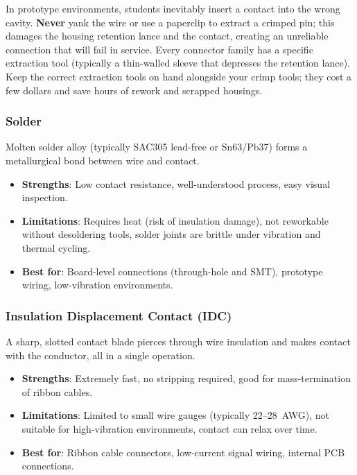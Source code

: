 \begin{warningbox}
In prototype environments, students inevitably insert a contact into the wrong cavity. \textbf{Never} yank the wire or use a paperclip to extract a crimped pin; this damages the housing retention lance and the contact, creating an unreliable connection that will fail in service. Every connector family has a specific extraction tool (typically a thin-walled sleeve that depresses the retention lance). Keep the correct extraction tools on hand alongside your crimp tools; they cost a few dollars and save hours of rework and scrapped housings.
\end{warningbox}

\subsubsection{Solder}

Molten solder alloy (typically SAC305 lead-free or Sn63/Pb37) forms a metallurgical bond between wire and contact.

\begin{itemize}[nosep,leftmargin=1.5em]
  \item \textbf{Strengths}: Low contact resistance, well-understood process, easy visual inspection.
  \item \textbf{Limitations}: Requires heat (risk of insulation damage), not reworkable without desoldering tools, solder joints are brittle under vibration and thermal cycling.
  \item \textbf{Best for}: Board-level connections (through-hole and SMT), prototype wiring, low-vibration environments.
\end{itemize}

\subsubsection{Insulation Displacement Contact (IDC)}

A sharp, slotted contact blade pierces through wire insulation and makes contact with the conductor, all in a single operation.

\begin{itemize}[nosep,leftmargin=1.5em]
  \item \textbf{Strengths}: Extremely fast, no stripping required, good for mass-termination of ribbon cables.
  \item \textbf{Limitations}: Limited to small wire gauges (typically 22--28~AWG), not suitable for high-vibration environments, contact can relax over time.
  \item \textbf{Best for}: Ribbon cable connectors, low-current signal wiring, internal PCB connections.
\end{itemize}

